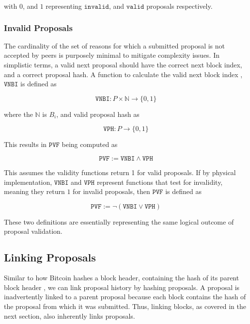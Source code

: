 \documentclass[10pt, titlepage, twocolumn]{report}
\newcommand*{\field}[1]{\mathbb{#1}}%
\begin{document}
with \(0\), and \(1\) representing \(\texttt{invalid}\), and \(\texttt{valid}\) proposals respectively.




\subsubsection{Invalid Proposals}
\hspace*{15pt}
The cardinality of the set of reasons for which a submitted proposal is not accepted by peers is purposely minimal to mitigate complexity issues. In simplistic terms, a valid next proposal should have the correct next block index, and a correct proposal hash. A function to calculate the valid next block index , \(\texttt{VNBI}\) is defined as

\begin{equation}
\texttt{VNBI} : P \times \field{N} \rightarrow \{ 0, 1\}
\end{equation}

where the \(\field{N}\) is \(B_i\), and valid proposal hash as

\begin{equation}
\texttt{VPH} : P \rightarrow \{ 0, 1\}
\end{equation}

This results in \( \texttt{PVF} \) being computed as

\begin{equation}
\texttt{PVF} := \texttt{VNBI} \land \texttt{VPH}
\end{equation}

\hspace*{15pt}
This assumes the validity functions return 1 for valid proposals. If by physical implementation, \( \texttt{VNBI} \) and \( \texttt{VPH} \) represent functions that test for invalidity, meaning they return \(1\) for invalid proposals, then \( \texttt{PVF} \) is defined as 

\begin{equation}
\texttt{PVF} := \neg (\texttt{VNBI} \lor \texttt{VPH})
\end{equation}

These two definitions are essentially representing the same logical outcome of proposal validation. 

\subsection{Linking Proposals}
\hspace*{15pt}
Similar to how Bitcoin hashes a block header, containing the hash of its parent block header \cite{BTC}, we can link proposal history by hashing proposals. A proposal is inadvertently linked to a parent proposal because each block contains the hash of the proposal from which it was submitted. Thus, linking blocks, as covered in the next section, also inherently links proposals.
\end{document}
